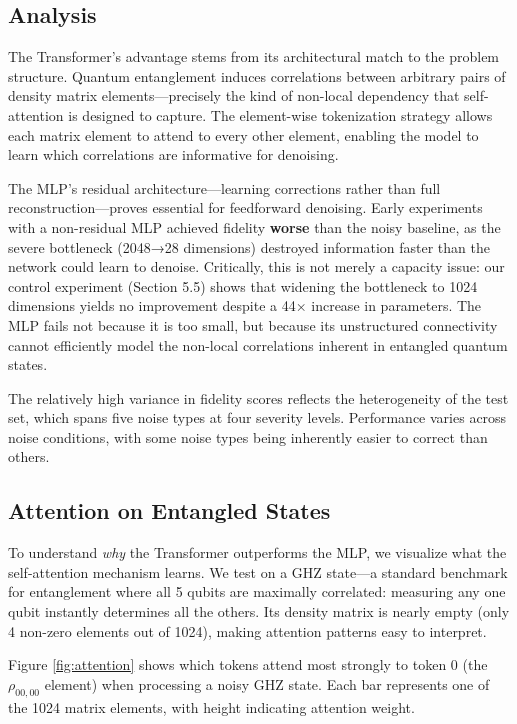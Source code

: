 \documentclass[11pt]{article}
\begin{document}
\subsection{Analysis}
\label{sec:org3516b75}
The Transformer's advantage stems from its architectural match to the problem structure. Quantum entanglement induces correlations between arbitrary pairs of density matrix elements—precisely the kind of non-local dependency that self-attention is designed to capture. The element-wise tokenization strategy allows each matrix element to attend to every other element, enabling the model to learn which correlations are informative for denoising.

The MLP's residual architecture—learning corrections rather than full reconstruction—proves essential for feedforward denoising. Early experiments with a non-residual MLP achieved fidelity \textbf{worse} than the noisy baseline, as the severe bottleneck (2048→28 dimensions) destroyed information faster than the network could learn to denoise. Critically, this is not merely a capacity issue: our control experiment (Section 5.5) shows that widening the bottleneck to 1024 dimensions yields no improvement despite a 44× increase in parameters. The MLP fails not because it is too small, but because its unstructured connectivity cannot efficiently model the non-local correlations inherent in entangled quantum states.

The relatively high variance in fidelity scores reflects the heterogeneity of the test set, which spans five noise types at four severity levels. Performance varies across noise conditions, with some noise types being inherently easier to correct than others.
\subsection{Attention on Entangled States}
\label{sec:org41e6da2}

To understand \emph{why} the Transformer outperforms the MLP, we visualize what the self-attention mechanism learns. We test on a GHZ state—a standard benchmark for entanglement where all 5 qubits are maximally correlated: measuring any one qubit instantly determines all the others. Its density matrix is nearly empty (only 4 non-zero elements out of 1024), making attention patterns easy to interpret.

Figure \ref{fig:attention} shows which tokens attend most strongly to token 0 (the \(\rho_{00,00}\) element) when processing a noisy GHZ state. Each bar represents one of the 1024 matrix elements, with height indicating attention weight.
\end{document}
